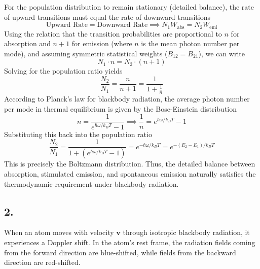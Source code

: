 \documentclass[11pt,a4paper]{article}
\begin{document}
For the population distribution to remain stationary (detailed balance), the rate of upward transitions must equal the rate of downward transitions
\[
\text{Upward Rate} = \text{Downward Rate} \implies N_1 W_{\text{abs}} = N_2 W_{\text{emi}}
\]
Using the relation that the transition probabilities are proportional to $n$ for absorption and $n+1$ for emission (where $n$ is the mean photon number per mode), and assuming symmetric statistical weights ($B_{12} = B_{21}$), we can write
\[
N_1 \cdot n = N_2 \cdot (n + 1)
\]
Solving for the population ratio yields
\[
\frac{N_2}{N_1} = \frac{n}{n+1} = \frac{1}{1 + \frac{1}{n}}
\]
According to Planck's law for blackbody radiation, the average photon number per mode in thermal equilibrium is given by the Bose-Einstein distribution
\[
n = \frac{1}{e^{\hbar\omega / k_B T} - 1} \implies \frac{1}{n} = e^{\hbar\omega / k_B T} - 1
\]
Substituting this back into the population ratio
\[
\frac{N_2}{N_1} = \frac{1}{1 + \left(e^{\hbar\omega / k_B T} - 1\right)} = e^{-\hbar\omega / k_B T} = e^{-(E_2 - E_1)/k_B T}
\]
This is precisely the Boltzmann distribution. Thus, the detailed balance between absorption, stimulated emission, and spontaneous emission naturally satisfies the thermodynamic requirement under blackbody radiation.

\subsection*{2.}
When an atom moves with velocity $\mathbf{v}$ through isotropic blackbody radiation, it experiences a Doppler shift. In the atom's rest frame, the radiation fields coming from the forward direction are blue-shifted, while fields from the backward direction are red-shifted.
\end{document}
